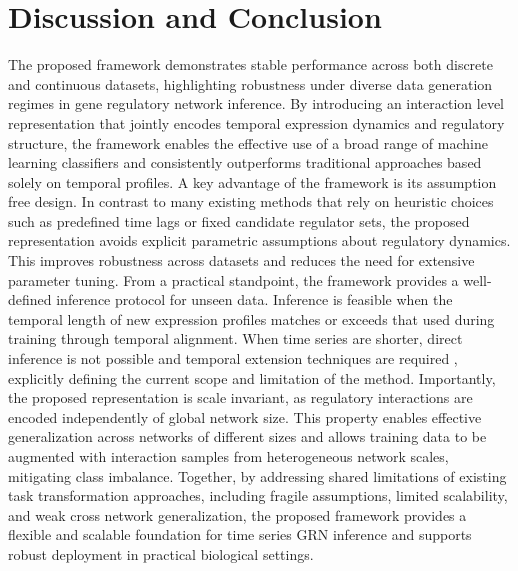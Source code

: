 \section{Discussion and Conclusion}
The proposed framework demonstrates stable performance across both discrete and continuous datasets, highlighting robustness under diverse data generation regimes in gene regulatory network inference. By introducing an interaction level representation that jointly encodes temporal expression dynamics and regulatory structure, the framework enables the effective use of a broad range of machine learning classifiers and consistently outperforms traditional approaches based solely on temporal profiles. A key advantage of the framework is its assumption free design. In contrast to many existing methods that rely on heuristic choices such as predefined time lags or fixed candidate regulator sets, the proposed representation avoids explicit parametric assumptions about regulatory dynamics. This improves robustness across datasets and reduces the need for extensive parameter tuning. From a practical standpoint, the framework provides a well-defined inference protocol for unseen data. Inference is feasible when the temporal length of new expression profiles matches or exceeds that used during training through temporal alignment. When time series are shorter, direct inference is not possible and temporal extension techniques are required \parencite{anh2025}, explicitly defining the current scope and limitation of the method. Importantly, the proposed representation is scale invariant, as regulatory interactions are encoded independently of global network size. This property enables effective generalization across networks of different sizes and allows training data to be augmented with interaction samples from heterogeneous network scales, mitigating class imbalance. Together, by addressing shared limitations of existing task transformation approaches, including fragile assumptions, limited scalability, and weak cross network generalization, the proposed framework provides a flexible and scalable foundation for time series GRN inference and supports robust deployment in practical biological settings.